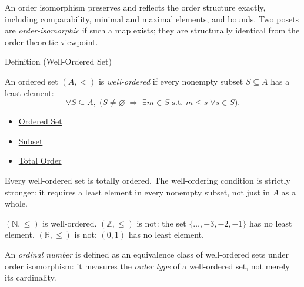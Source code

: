 \begin{remark*}
An order isomorphism preserves and reflects the order structure exactly,
including comparability, minimal and maximal elements, and bounds. Two posets
are \emph{order-isomorphic} if such a map exists; they are structurally
identical from the order-theoretic viewpoint.
\end{remark*}

\begin{definitionbox}{Definition (Well-Ordered Set)}
\begin{definition}\label{def:well-order}
An ordered set $(A,<)$ is \emph{well-ordered} if every nonempty subset
$S \subseteq A$ has a least element:
\[
\forall S \subseteq A,\;
\bigl(S \neq \varnothing \;\Rightarrow\; \exists m \in S \text{ s.t.\ }
m \leq s \;\forall s \in S\bigr).
\]
\end{definition}
\end{definitionbox}

\begin{dependencies}
\begin{itemize}
  \item \hyperref[def:ordered-set]{Ordered Set}
  \item \hyperref[def:subset]{Subset}
  \item \hyperref[def:total-order]{Total Order}
\end{itemize}
\end{dependencies}

\begin{remark*}
Every well-ordered set is totally ordered. The well-ordering condition is
strictly stronger: it requires a least element in every nonempty subset,
not just in $A$ as a whole.
\end{remark*}

\begin{example*}
$(\mathbb{N},\leq)$ is well-ordered. $(\mathbb{Z},\leq)$ is not: the set
$\{\dots,-3,-2,-1\}$ has no least element. $(\mathbb{R},\leq)$ is not:
$(0,1)$ has no least element.
\end{example*}

\begin{remark*}
An \emph{ordinal number} is defined as an equivalence class of well-ordered
sets under order isomorphism: it measures the \emph{order type} of a
well-ordered set, not merely its cardinality.
\end{remark*}

